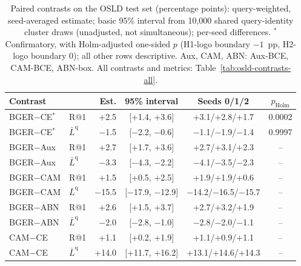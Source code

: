 \begin{table}[t]
\centering\small\setlength{\tabcolsep}{2.6pt}
\caption{Paired contrasts on the OSLD test set (percentage points): query-weighted, seed-averaged estimate; basic 95\% interval from 10,000 shared query-identity cluster draws (unadjusted, not simultaneous); per-seed differences. $^\ast$Confirmatory, with Holm-adjusted one-sided $p$ (H1-logo boundary $-1$~pp, H2-logo boundary 0); all other rows descriptive. Aux, CAM, ABN: Aux-BCE, CAM-BCE, ABN-box. All contrasts and metrics: Table~\ref{tab:osld-contrasts-all}.}
\label{tab:osld-contrasts}
\begin{tabular}{llrccc}
\toprule
Contrast & & Est. & 95\% interval & Seeds 0/1/2 & $p_{\mathrm{Holm}}$\\
\midrule
BGER$-$CE$^\ast$ & R@1 & +2.5 & [+1.4, +3.6] & +3.1/+2.8/+1.7 & 0.0002\\
BGER$-$CE$^\ast$ & $\bar L^{\mathrm q}$ & $-$1.5 & [$-$2.2, $-$0.6] & $-$1.1/$-$1.9/$-$1.4 & 0.9997\\
\midrule
BGER$-$Aux & R@1 & +2.7 & [+1.7, +3.6] & +2.7/+3.1/+2.3 & --\\
BGER$-$Aux & $\bar L^{\mathrm q}$ & $-$3.3 & [$-$4.3, $-$2.2] & $-$4.1/$-$3.5/$-$2.3 & --\\
BGER$-$CAM & R@1 & +1.5 & [+0.5, +2.5] & +1.9/+1.9/+0.6 & --\\
BGER$-$CAM & $\bar L^{\mathrm q}$ & $-$15.5 & [$-$17.9, $-$12.9] & $-$14.2/$-$16.5/$-$15.7 & --\\
BGER$-$ABN & R@1 & +2.6 & [+1.5, +3.7] & +2.7/+3.2/+1.9 & --\\
BGER$-$ABN & $\bar L^{\mathrm q}$ & $-$2.0 & [$-$2.8, $-$1.0] & $-$2.8/$-$2.0/$-$1.1 & --\\
CAM$-$CE & R@1 & +1.1 & [+0.2, +1.9] & +1.1/+0.9/+1.1 & --\\
CAM$-$CE & $\bar L^{\mathrm q}$ & +14.0 & [+11.7, +16.2] & +13.1/+14.6/+14.3 & --\\
\bottomrule
\end{tabular}
\end{table}
